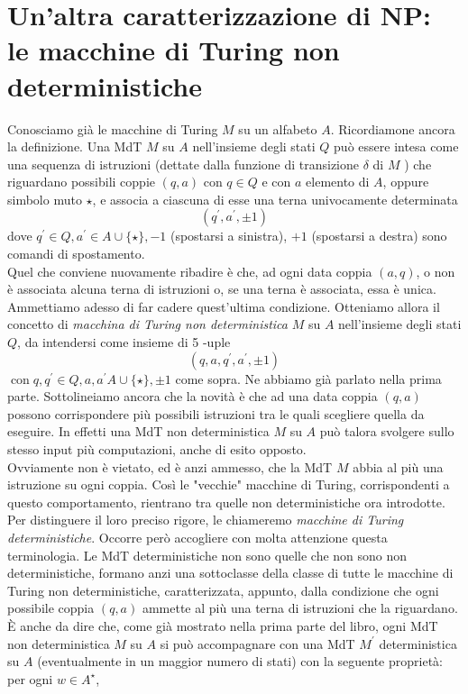 \section{Un'altra caratterizzazione di NP: le macchine di Turing non deterministiche}

Conosciamo già le macchine di Turing $M$ su un alfabeto $A$. Ricordiamone ancora
la definizione. Una MdT $M$ su $A$ nell'insieme degli stati $Q$ può essere
intesa come una sequenza di istruzioni (dettate dalla funzione di transizione
$\delta$ di $M$ ) che riguardano possibili coppie $(q, a)$ con $q \in Q$ e con
$a$ elemento di $A$, oppure simbolo muto $\star$, e associa a ciascuna di esse
una terna univocamente determinata
$$
    \left(q^{\prime}, a^{\prime}, \pm 1\right)
$$
dove $q^{\prime} \in Q, a^{\prime} \in A \cup\{\star\},-1$ (spostarsi a
sinistra), $+1$ (spostarsi a destra) sono comandi di spostamento.\\ Quel che
conviene nuovamente ribadire è che, ad ogni data coppia $(a, q)$, o non è
associata alcuna terna di istruzioni o, se una terna è associata, essa è unica.
Ammettiamo adesso di far cadere quest'ultima condizione. Otteniamo allora il
concetto di \textit{macchina di Turing non deterministica} $M$ su $A$ nell'insieme degli
stati $Q$, da intendersi come insieme di 5 -uple
$$
    \left(q, a, q^{\prime}, a^{\prime}, \pm 1\right)
$$
$\operatorname{con} q, q^{\prime} \in Q, a, a^{\prime} A \cup\{\star\}, \pm 1$
come sopra. Ne abbiamo già parlato nella prima parte. Sottolineiamo ancora che
la novità è che ad una data coppia $(q, a)$ possono corrispondere più possibili
istruzioni tra le quali scegliere quella da eseguire. In effetti una MdT non
deterministica $M$ su $A$ può talora svolgere sullo stesso input più
computazioni, anche di esito opposto.\\ Ovviamente non è vietato, ed è anzi
ammesso, che la MdT $M$ abbia al più una istruzione su ogni coppia. Così le
"vecchie" macchine di Turing, corrispondenti a questo comportamento, rientrano
tra quelle non deterministiche ora introdotte. Per distinguere il loro preciso
rigore, le chiameremo \textit{macchine di Turing deterministiche}. Occorre però
accogliere con molta attenzione questa terminologia. Le MdT deterministiche non
sono quelle che non sono non deterministiche, formano anzi una sottoclasse della
classe di tutte le macchine di Turing non deterministiche, caratterizzata,
appunto, dalla condizione che ogni possibile coppia $(q, a)$ ammette al più una
terna di istruzioni che la riguardano.\\
È anche da dire che, come già mostrato nella prima parte del libro, ogni MdT non
deterministica $M$ su $A$ si può accompagnare con una MdT $M^{\prime}$
deterministica su $A$ (eventualmente in un maggior numero di stati) con la
seguente proprietà: per ogni $w \in A^{\star}$,

